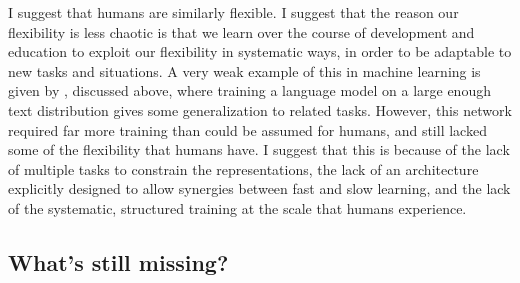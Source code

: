 I suggest that humans are similarly flexible. I suggest that the reason our flexibility is less chaotic is that we learn over the course of development and education to exploit our flexibility in systematic ways, in order to be adaptable to new tasks and situations. A very weak example of this in machine learning is given by \citet{Radford2019}, discussed above, where training a language model on a large enough text distribution gives some generalization to related tasks. However, this network required far more training than could be assumed for humans, and still lacked some of the flexibility that humans have. I suggest that this is because of the lack of multiple tasks to constrain the representations, the lack of an architecture explicitly designed to allow synergies between fast and slow learning, and the lack of the systematic, structured training at the scale that humans experience. \par 

\subsection{What's still missing?}

